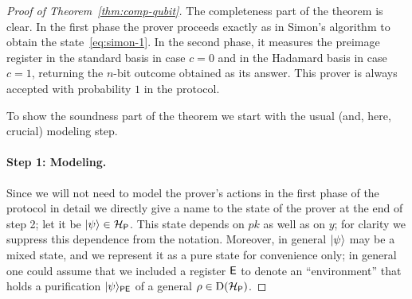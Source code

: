 \begin{itemize}
\end{itemize}

\begin{proof}[Proof of Theorem~\ref{thm:comp-qubit}]
The completeness part of the theorem is clear. In the first phase the prover proceeds exactly as in Simon's algorithm to obtain the state~\eqref{eq:simon-1}. In the second phase, it measures the preimage register in the standard basis in case $c=0$ and in the Hadamard basis in case $c=1$, returning the $n$-bit outcome obtained as its answer. This prover is always accepted with probability $1$ in the protocol. 

To show the soundness part of the theorem we start with the usual (and, here, crucial) modeling step. 

\paragraph{Step 1: Modeling.} Since we will not need to model the prover's actions in the  first phase of the protocol in detail we directly give a name to the state of the prover at the end of step 2; let it be $|\psi\rangle \in  \mathcal{H}_{{\textsf{P}}}$. This state depends on $pk$ as well as on $y$; for clarity we suppress this dependence from the notation. Moreover, in general $|\psi\rangle$ may be a mixed state, and we represent it as a pure state for convenience only; in general one could assume that we included a register ${\textsf{E}}$ to denote an ``environment'' that holds a purification $|\psi\rangle_{{\textsf{PE}}}$ of a general $\rho \in \mathrm{D}(\mathcal{H}_{{\textsf{P}}})$. 


\end{proof}
